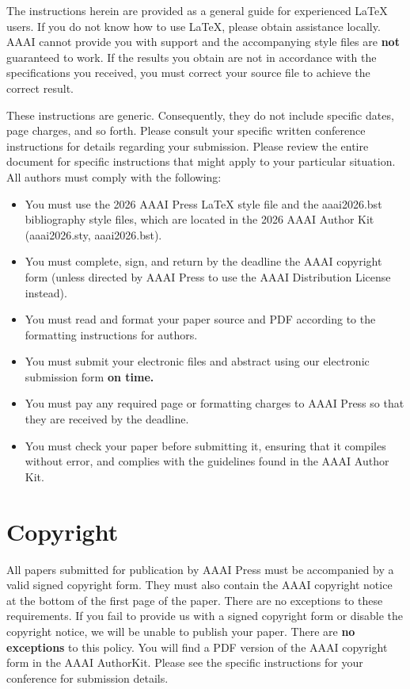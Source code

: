 The instructions herein are provided as a general guide for experienced \LaTeX{} users. If you do not know how to use \LaTeX{}, please obtain assistance locally. AAAI cannot provide you with support and the accompanying style files are \textbf{not} guaranteed to work. If the results you obtain are not in accordance with the specifications you received, you must correct your source file to achieve the correct result.

These instructions are generic. Consequently, they do not include specific dates, page charges, and so forth. Please consult your specific written conference instructions for details regarding your submission. Please review the entire document for specific instructions that might apply to your particular situation. All authors must comply with the following:

\begin{itemize}
\item You must use the 2026 AAAI Press \LaTeX{} style file and the aaai2026.bst bibliography style files, which are located in the 2026 AAAI Author Kit (aaai2026.sty, aaai2026.bst).
\item You must complete, sign, and return by the deadline the AAAI copyright form (unless directed by AAAI Press to use the AAAI Distribution License instead).
\item You must read and format your paper source and PDF according to the formatting instructions for authors.
\item You must submit your electronic files and abstract using our electronic submission form \textbf{on time.}
\item You must pay any required page or formatting charges to AAAI Press so that they are received by the deadline.
\item You must check your paper before submitting it, ensuring that it compiles without error, and complies with the guidelines found in the AAAI Author Kit.
\end{itemize}

\section{Copyright}
All papers submitted for publication by AAAI Press must be accompanied by a valid signed copyright form. They must also contain the AAAI copyright notice at the bottom of the first page of the paper. There are no exceptions to these requirements. If you fail to provide us with a signed copyright form or disable the copyright notice, we will be unable to publish your paper. There are \textbf{no exceptions} to this policy. You will find a PDF version of the AAAI copyright form in the AAAI AuthorKit. Please see the specific instructions for your conference for submission details.

